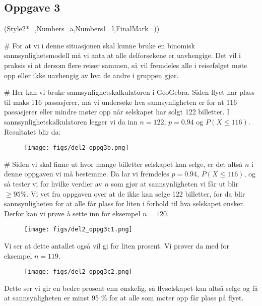 \subsection*{Oppgave 3}
\begin{easylist}[enumerate]
	\ListProperties(Style2*=,Numbers=a,Numbers1=l,FinalMark={)})
	
	# For at vi i denne situasjonen skal kunne bruke en binomisk sannsynlighetsmodell må vi anta at alle delforsøkene er uavhengige. 
	Det vil i praksis si at dersom flere reiser sammen, så vil fremdeles alle i reisefølget møte opp eller ikke uavhengig av hva de andre i gruppen gjør.
	
	# Her kan vi bruke sannsynlighetskalkulatoren i GeoGebra. 
	Siden flyet har plass til maks 116 passasjerer, må vi undersøke hva sannsynligheten er for at 116 passasjerer eller mindre møter opp når selskapet har solgt 122 billetter. 
	I sannsynlighetskalkulatoren legger vi da inn $n = 122$, $p = 0.94$ og $P(X \leq 116)$. Resultatet blir da:
	\begin{figure}[ht!]
		\centering
		\texttt{[image: figs/del2\_oppg3b.png]}
		\label{fig:del2_oppg3b}
	\end{figure}
	

	# Siden vi skal finne ut hvor mange billetter selskapet kan selge, er det altså $n$ i denne oppgaven vi må bestemme. Da lar vi fremdeles $p = 0.94$, $P(X \leq 116)$, og så tester vi for hvilke verdier av $n$ som gjør at sannsynligheten vi får ut blir $\geq 95 \% $. Vi vet fra oppgaven over at de ikke kan selge 122 billetter, for da blir sannsynligheten for at alle får plass for liten i forhold til hva selskapet ønsker. Derfor kan vi prøve å sette inn for eksempel $n = 120$.
	\begin{figure}[ht!]
		\centering
		\texttt{[image: figs/del2\_oppg3c1.png]}
	\end{figure}
	
	Vi ser at dette antallet også vil gi for liten prosent. Vi prøver da med for eksempel $n = 119$.
	
	\begin{figure}[ht!]
		\centering
		\texttt{[image: figs/del2\_oppg3c2.png]}
	\end{figure}
	
	Dette ser vi gir en bedre prosent enn ønskelig, så flyselskapet kan altså selge  og få at sannsynligheten er minst 95 \% for at alle som møter opp får plass på flyet.	
	
	
\end{easylist}

